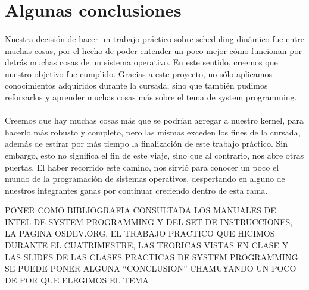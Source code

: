 \documentclass[11pt, a4paper]{article}
\begin{document}
\section{Algunas conclusiones}

\paragraph{}
Nuestra decisión de hacer un trabajo práctico sobre scheduling dinámico fue entre muchas cosas, por el hecho de poder entender un poco mejor cómo funcionan por detrás muchas cosas de un sistema operativo. En este sentido, creemos que nuestro objetivo fue cumplido. Gracias a este proyecto, no sólo aplicamos conocimientos adquiridos durante la cursada, sino que también pudimos reforzarlos y aprender muchas cosas más sobre el tema de system programming. 

\paragraph{}
Creemos que hay muchas cosas más que se podrían agregar a nuestro kernel, para hacerlo más robusto y completo, pero las mismas exceden los fines de la cursada, además de estirar por más tiempo la finalización de este trabajo práctico. Sin embargo, esto no significa el fin de este viaje, sino que al contrario, nos abre otras puertas. El haber recorrido este camino, nos sirvió para conocer un poco el mundo de la programación de sistemas operativos, despertando en alguno de nuestros integrantes ganas por continuar creciendo dentro de esta rama.





\Huge{PONER COMO BIBLIOGRAFIA CONSULTADA LOS MANUALES DE INTEL DE SYSTEM PROGRAMMING Y DEL SET DE INSTRUCCIONES, LA PAGINA OSDEV.ORG, EL TRABAJO PRACTICO QUE HICIMOS DURANTE EL CUATRIMESTRE, LAS TEORICAS VISTAS EN CLASE Y LAS SLIDES DE LAS CLASES PRACTICAS DE SYSTEM PROGRAMMING. SE PUEDE PONER ALGUNA ``CONCLUSION'' CHAMUYANDO UN POCO DE POR QUE ELEGIMOS EL TEMA}
\end{document}
